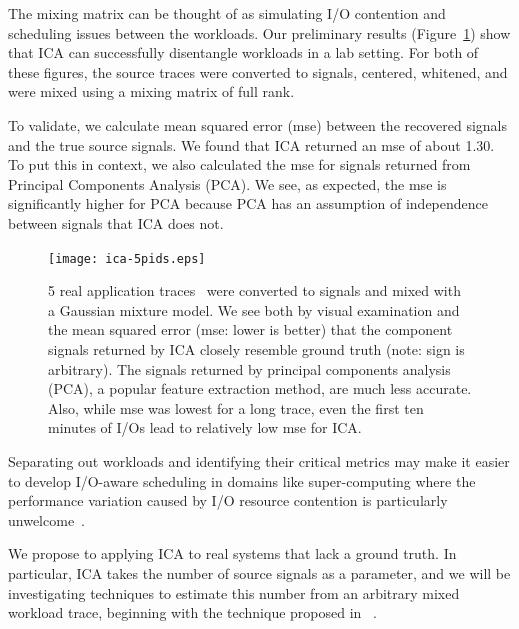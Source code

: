 The mixing matrix can be thought of as simulating I/O
contention and scheduling issues between the workloads.  
Our preliminary results (Figure~\ref{fig:ica}) show that ICA
can successfully disentangle workloads in a lab setting.  For both of these
figures, the source traces were converted to signals, centered, whitened, and were mixed using
a mixing matrix of full rank.

To validate, we calculate mean squared error (mse) between the recovered signals and
the true source signals.  We found that ICA returned an mse of about 1.30.  To
put this in context, we also calculated the mse for signals returned from
Principal Components Analysis (PCA).  We see, as expected, the mse is
significantly higher for PCA because PCA has an assumption of independence
between signals that ICA does not. 

\begin{figure}
  \centering
  \texttt{[image: ica-5pids.eps]}
  \caption{5 real application traces~\cite{fiu} were converted to signals and mixed with a
  Gaussian mixture model.  We see both by visual examination and the mean
  squared error (mse: lower is better) that the component signals returned by ICA closely resemble ground truth (note: sign is arbitrary).  The signals
  returned by principal components analysis (PCA), a popular feature extraction
  method, are much less accurate.  Also, while mse was lowest for a long
  trace, even the first ten minutes of I/Os lead to relatively low mse for ICA.}
  \label{fig:ica}
\end{figure}

Separating out workloads and identifying their critical metrics may make it
easier to develop I/O-aware scheduling in domains like super-computing where the
performance variation caused by I/O
resource contention is particularly unwelcome~\cite{liufast14}.

We propose to applying ICA to real systems that lack a
ground truth. 
In particular, ICA takes the number of source signals as a
parameter, and we will be investigating techniques to estimate this number from
an arbitrary mixed workload trace, beginning with the technique proposed in
~\cite{Sparse component analysis and blind source separation of underdetermined
mixtures
}. %

